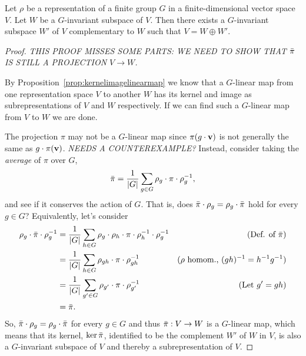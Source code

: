 \begin{proposition}\label{prop:complsubrepr}
	Let $\rho$ be a representation of a finite group $G$ in a finite-dimensional vector space $V$. Let $W$ be a $G$-invariant subspace of $V$. Then there exists a $G$-invariant subspace $W'$ of $V$ complementary to $W$ such that $V = W \oplus W'$.
\end{proposition}
\begin{proof}
	\textit{THIS PROOF MISSES SOME PARTS: WE NEED TO SHOW THAT $\bar{\pi}$ IS STILL A PROJECTION $V \rightarrow W$.}	
	
	By Proposition~\ref{prop:kernelimagelinearmap} we know that a $G$-linear map from one representation space $V$ to another $W$ has its kernel and image as subrepresentations of $V$ and $W$ respectively. If we can find such a $G$-linear map from $V$ to $W$ we are done.
	
	The projection $\pi$ may not be a $G$-linear map since $\pi(g \cdot \mathbf{v})$ is not generally the same as $g \cdot \pi(\mathbf{v})$. \textit{NEEDS A COUNTEREXAMPLE?}
	Instead, consider taking the \textit{average} of $\pi$ over $G$,
	\begin{align*}
		\bar{\pi} = \frac{1}{|G|} \sum_{g \in G} \rho_g \cdot \pi \cdot \rho_g^{-1},
	\end{align*}
	and see if it conserves the action of $G$. That is, does $\bar{\pi}\cdot \rho_g = \rho_g \cdot \bar{\pi}$ hold for every $g \in G$? Equivalently, let's consider
	\begin{align*}
		\rho_g \cdot \bar{\pi} \cdot \rho_g^{-1} &= \frac{1}{|G|} \sum_{h \in G} \rho_g \cdot \rho_h \cdot \pi \cdot \rho_h^{-1} \cdot \rho_g^{-1} & \text{(Def. of $\bar{\pi}$)}\\
		&= \frac{1}{|G|} \sum_{h \in G} \rho_{gh} \cdot \pi \cdot \rho_{gh}^{-1} & \text{($\rho$ homom., $(gh)^{-1}=h^{-1}g^{-1}$)}\\
		&= \frac{1}{|G|} \sum_{g' \in G} \rho_{g'} \cdot \pi \cdot \rho_{g'}^{-1} & \text{(Let $g' = gh$)} \\
		&= \bar{\pi}.
	\end{align*}
	So, $\bar{\pi} \cdot \rho_g = \rho_g \cdot \bar{\pi}$ for every $g \in G$ and thus $\bar{\pi}: V \rightarrow W$ is a $G$-linear map, which means that its kernel, $\ker \bar{\pi}$, identified to be the complement $W'$ of $W$ in $V$, is also a $G$-invariant subspace of $V$ and thereby a subrepresentation of $V$.
\end{proof}

